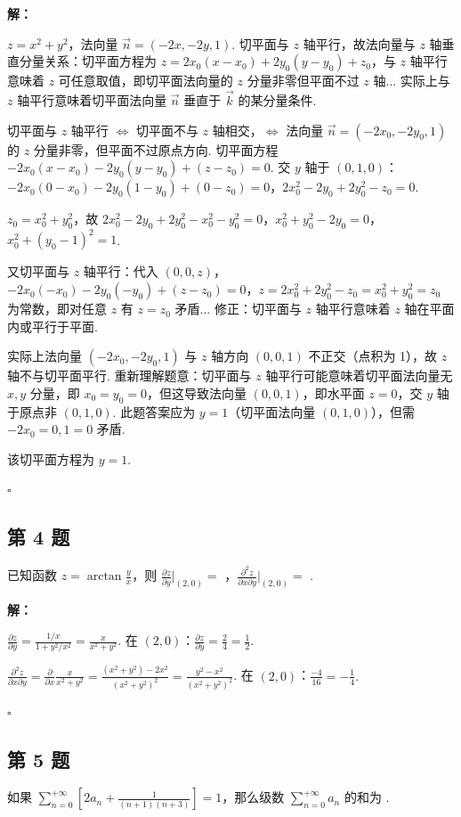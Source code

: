\documentclass[12pt,a4paper]{article}
\newenvironment{sol}[1][解]{%
  \par\medskip\noindent\textbf{#1：}\itshape\par\noindent\ignorespaces
}{%
  \par\hfill$\square$\par\medskip
}
\begin{document}
\begin{sol}$z=x^2+y^2$，法向量 $\vec{n}=(-2x,-2y,1)$. 切平面与 $z$ 轴平行，故法向量与
  $z$ 轴垂直分量关系：切平面方程为 $z=2x_0(x-x_0)+2y_0(y-y_0)+z_0$，与 $z$ 轴平行意味着 $z$
  可任意取值，即切平面法向量的 $z$ 分量非零但平面不过 $z$ 轴... 实际上与 $z$ 轴平行意味着切平面法向量 $\vec{n}$
  垂直于 $\vec{k}$ 的某分量条件.

  切平面与 $z$ 轴平行 $\Leftrightarrow$ 切平面不与 $z$ 轴相交，$\Leftrightarrow$ 法向量
  $\vec{n}=(-2x_0,-2y_0,1)$ 的 $z$ 分量非零，但平面不过原点方向. 切平面方程
  $-2x_0(x-x_0)-2y_0(y-y_0)+(z-z_0)=0$. 交 $y$ 轴于
  $(0,1,0)$：$-2x_0(0-x_0)-2y_0(1-y_0)+(0-z_0)=0$，$2x_0^2-2y_0+2y_0^2-z_0=0$.

  $z_0=x_0^2+y_0^2$，故
  $2x_0^2-2y_0+2y_0^2-x_0^2-y_0^2=0$，$x_0^2+y_0^2-2y_0=0$，$x_0^2+(y_0-1)^2=1$.

  又切平面与 $z$ 轴平行：代入
  $(0,0,z)$，$-2x_0(-x_0)-2y_0(-y_0)+(z-z_0)=0$，$z=2x_0^2+2y_0^2-z_0=x_0^2+y_0^2=z_0$
  为常数，即对任意 $z$ 有 $z=z_0$ 矛盾... 修正：切平面与 $z$ 轴平行意味着 $z$ 轴在平面内或平行于平面.

  实际上法向量 $(-2x_0,-2y_0,1)$ 与 $z$ 轴方向 $(0,0,1)$ 不正交（点积为 1），故 $z$
  轴不与切平面平行. 重新理解题意：切平面与 $z$ 轴平行可能意味着切平面法向量无 $x,y$ 分量，即
  $x_0=y_0=0$，但这导致法向量 $(0,0,1)$，即水平面 $z=0$，交 $y$ 轴于原点非 $(0,1,0)$.
  此题答案应为 $y=1$（切平面法向量 $(0,1,0)$），但需 $-2x_0=0, 1=0$ 矛盾.

  该切平面方程为 $\boxed{y=1}$.

\end{sol}
\subsection*{第 4 题}
已知函数 $z=\arctan\frac{y}{x}$，则 $\frac{\partial z}{\partial
y}|_{(2,0)}=$ \underline{\qquad\qquad}，$\frac{\partial^2 z}{\partial
x \partial y}|_{(2,0)}=$ \underline{\qquad\qquad}.

\begin{sol}$\frac{\partial z}{\partial
  y}=\frac{1/x}{1+y^2/x^2}=\frac{x}{x^2+y^2}$. 在
  $(2,0)$：$\frac{\partial z}{\partial y}=\frac{2}{4}=\frac{1}{2}.$

  $\frac{\partial^2 z}{\partial x\partial y}=\frac{\partial}{\partial
  x}\frac{x}{x^2+y^2}=\frac{(x^2+y^2)-2x^2}{(x^2+y^2)^2}=\frac{y^2-x^2}{(x^2+y^2)^2}$.
  在 $(2,0)$：$\frac{-4}{16}=-\frac{1}{4}.$

\end{sol}
\subsection*{第 5 题}
如果
$\sum_{n=0}^{+\infty}\left[2a_n+\frac{1}{(n+1)(n+3)}\right]=1$，那么级数
$\sum_{n=0}^{+\infty}a_n$ 的和为 \underline{\qquad\qquad}.
\end{document}

